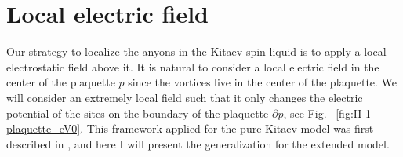 \section{Local electric field}\label{sec:local-electric-field}

Our strategy to localize the anyons in the Kitaev spin liquid is to apply a local electrostatic field above it. %
It is natural to consider a local electric field in the center of the plaquette $p$ since the vortices live in the center of the plaquette.
We will consider an extremely local field such that it only changes the electric potential of the sites on the boundary of the plaquette $\partial p$, see Fig.~ \ref{fig:II-1-plaquette_eV0}. This framework applied for the pure Kitaev model was first described in \cite{Pereira2020}, and here I will present the generalization for the extended model.


